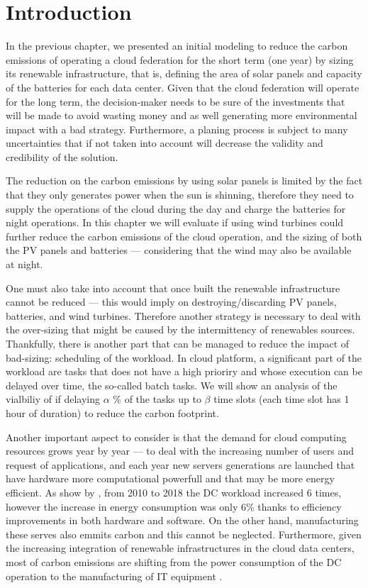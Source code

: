 \section{Introduction}

In the previous chapter, we presented an initial modeling to reduce the carbon emissions of operating a cloud federation for the short term (one year) by sizing its renewable infrastructure, that is, defining the area of solar panels and capacity of the batteries for each data center.  Given that the cloud federation will operate for the long term, the decision-maker needs to be sure of the investments that will be made to avoid wasting money and as well generating more environmental impact with a bad strategy. Furthermore, a planing process is subject to many uncertainties that if not taken into account will decrease the validity and credibility of the solution.

The reduction on the carbon emissions by using solar panels is limited by the fact that they only generates power when the sun is shinning, therefore they need to supply the operations of the cloud during the day and charge the batteries for night operations. In this chapter we will evaluate if using wind turbines could further reduce the carbon emissions of the cloud operation, and the sizing of both the PV panels and batteries --- considering that the wind may also be available at night.

One must also take into account that once built the renewable infrastructure cannot be reduced --- this would imply on destroying/discarding PV panels, batteries, and wind turbines. Therefore another strategy is necessary to deal with the over-sizing that might be caused by the intermittency of renewables sources. Thankfully, there is another part that can be managed to reduce the impact of bad-sizing: scheduling of the workload. In cloud platform, a significant part of the workload are tasks that does not have a high prioriry and whose execution can be delayed over time, the so-called batch tasks. We will show an analysis of the vialbiliy of if delaying $\alpha$ \% of the tasks up  to $\beta$ time slots (each time slot has 1 hour of duration) to reduce the carbon footprint.

Another important aspect to consider is that the demand for cloud computing resources grows year by year --- to deal with the increasing number of users and request of applications, and each year new servers generations are launched that have hardware more computational powerfull and that may be more energy efficient. As show by \citet{masanet2020recalibrating}, from 2010 to 2018 the DC workload increased 6 times, however the increase in energy consumption was only 6\% thanks to efficiency improvements in both hardware and software.  On the other hand, manufacturing these serves also emmits carbon and this cannot be neglected. Furthermore, given the increasing integration of renewable infrastructures in the cloud data centers, most of carbon emissions are shifting from the power consumption of the DC operation to the manufacturing of IT equipment \cite{gupta2021_chasingcarbon}.

